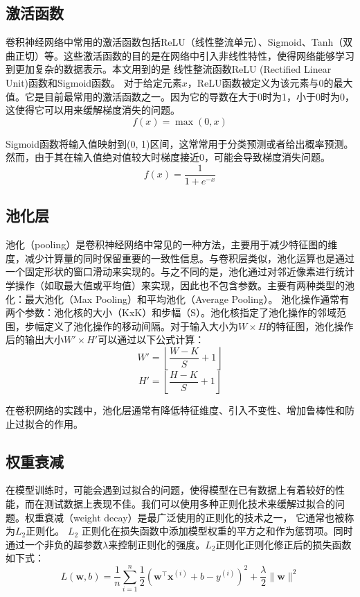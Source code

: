 \subsection{激活函数}
卷积神经网络中常用的激活函数包括ReLU（线性整流单元）、Sigmoid、Tanh（双曲正切）等。这些激活函数的目的是在网络中引入非线性特性，使得网络能够学习到更加复杂的数据表示。本文用到的是 线性整流函数ReLU (Rectified Linear Unit)函数和Sigmoid函数。
对于给定元素$x$，ReLU函数被定义为该元素与$0$的最大值。它是目前最常用的激活函数之一。因为它的导数在大于0时为1，小于0时为0，这使得它可以用来缓解梯度消失的问题。
\begin{equation}
  f(x) = \max(0, x)
\end{equation}

Sigmoid函数将输入值映射到(0, 1)区间，这常常用于分类预测或者给出概率预测。然而，由于其在输入值绝对值较大时梯度接近0，可能会导致梯度消失问题。
\begin{equation}
  f(x) = \frac{1}{1 + e^{-x}}
\end{equation}

\subsection{池化层}
池化（pooling）是卷积神经网络中常见的一种方法，主要用于减少特征图的维度，减少计算量的同时保留重要的一致性信息。与卷积层类似，池化运算也是通过一个固定形状的窗口滑动来实现的。与之不同的是，池化通过对邻近像素进行统计学操作（如取最大值或平均值）来实现，因此也不包含参数。主要有两种类型的池化：最大池化（Max Pooling）和平均池化（Average Pooling）。
池化操作通常有两个参数：池化核的大小（KxK）和步幅（S）。池化核指定了池化操作的邻域范围，步幅定义了池化操作的移动间隔。对于输入大小为$W \times H$的特征图，池化操作后的输出大小$W' \times H'$可以通过以下公式计算：
\begin{equation}
  W' = \left\lfloor\frac{W - K}{S} + 1\right\rfloor
\end{equation}
\begin{equation}
  H' = \left\lfloor\frac{H - K}{S} + 1\right\rfloor
\end{equation}

在卷积网络的实践中，池化层通常有降低特征维度、引入不变性、增加鲁棒性和防止过拟合的作用。

\subsection{权重衰减}
在模型训练时，可能会遇到过拟合的问题，使得模型在已有数据上有着较好的性能，而在测试数据上表现不佳。我们可以使用多种正则化技术来缓解过拟合的问题。权重衰减（weight decay）是最广泛使用的正则化的技术之一， 它通常也被称为$L_2$正则化。
$L_2$ 正则化在损失函数中添加模型权重的平方之和作为惩罚项。同时通过一个非负的超参数$\lambda$来控制正则化的强度。$L_2$正则化正则化修正后的损失函数如下式：
\begin{equation}
  L(\mathbf{w}, b)=\frac{1}{n} \sum_{i=1}^{n} \frac{1}{2}\left(\mathbf{w}^{\top} \mathbf{x}^{(i)}+b-y^{(i)}\right)^{2}+\frac{\lambda}{2}\|\mathbf{w}\|^{2}
\end{equation}

